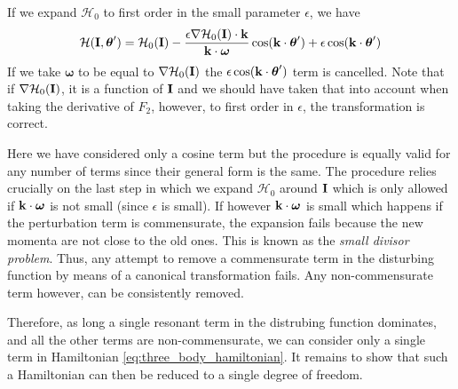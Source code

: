 If we expand $\mathcal{H}_0$ to first order in the small parameter 
$\epsilon$, we have
\begin{equation}
    \mathcal{H}(\boldsymbol{\mathbf{I}},\boldsymbol{\theta}')=\mathcal{H}_0(\boldsymbol{\mathbf{I}})
    - \frac{\epsilon\nabla \mathcal{H}_0(\boldsymbol{\mathbf{I}})\cdot\boldsymbol{\mathbf{k}}}{
        \boldsymbol{\mathbf{k}}\cdot\boldsymbol{\omega}} \cos(\boldsymbol{\mathbf{k}}\cdot
    \boldsymbol{\theta}')+\epsilon\cos(\boldsymbol{\mathbf{k}}\cdot\boldsymbol{\theta}')
\end{equation}
If we take $\boldsymbol{\omega}$ to be equal to $\nabla\mathcal{H}_0(\boldsymbol{\mathbf{I}})$
the $\epsilon\cos(\boldsymbol{\mathbf{k}}\cdot\boldsymbol{\theta}')$ term is cancelled. Note
that if $\nabla\mathcal{H}_0(\boldsymbol{\mathbf{I}})$, it is a function of $\boldsymbol{\mathbf{I}}$ and 
we should have taken that into account when taking the derivative of $F_2$, 
however, to first order in $\epsilon$, the transformation is correct.

Here we have 
considered only a cosine term but the procedure is equally valid for any
number of terms since their general form is the same. The procedure 
relies crucially on the last step in which we expand $\mathcal{H}_0$ around
$\boldsymbol{\mathbf{I}}$ which is only allowed if $\boldsymbol{\mathbf{k}}\cdot\boldsymbol{\omega}$ is not
small (since $\epsilon$ is small). If however $\boldsymbol{\mathbf{k}}\cdot\boldsymbol{\omega}$
is small which happens if the perturbation term is commensurate, the expansion
fails because the new momenta are not close to the old ones. This is known
as the \emph{small divisor problem}. Thus, any attempt to remove a 
commensurate term in the disturbing function by means of a canonical transformation
fails. Any non-commensurate term however, can be consistently removed.

Therefore, as long a single resonant term in the distrubing function dominates, and
all the other terms are non-commensurate, we can consider only a single term
in Hamiltonian \ref{eq:three_body_hamiltonian}. It remains to show that 
such a Hamiltonian can then be reduced to a single degree of freedom.
